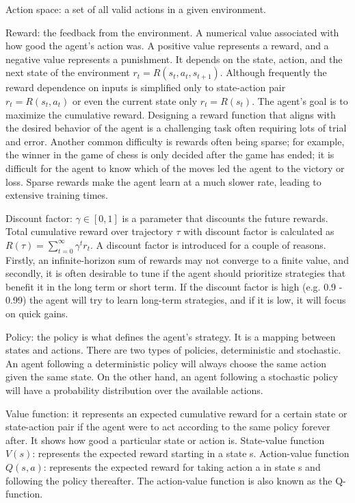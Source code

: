 \bigskip \noindent
Action space: a set of all valid actions in a given environment.

\bigskip \noindent
Reward: the feedback from the environment. A numerical value associated with how good the agent's action was. A positive value represents a reward, and a negative value represents a punishment. It depends on the state, action, and the next state of the environment $r_t = R(s_t, a_t, s_{t+1})$. Although frequently the reward dependence on inputs is simplified only to state-action pair $r_t = R(s_t, a_t)$ or even the current state only $r_t = R(s_t)$. The agent's goal is to maximize the cumulative reward. Designing a reward function that aligns with the desired behavior of the agent is a challenging task often requiring lots of trial and error. Another common difficulty is rewards often being sparse; for example, the winner in the game of chess is only decided after the game has ended; it is difficult for the agent to know which of the moves led the agent to the victory or loss. Sparse rewards make the agent learn at a much slower rate, leading to extensive training times.

\bigskip \noindent
Discount factor: $\gamma \in [0,1] $ is a parameter that discounts the future rewards. Total cumulative reward over trajectory $\tau$ with discount factor is calculated as $R(\tau) = \sum_{t=0}^{\infty} \gamma^t r_t$. A discount factor is introduced for a couple of reasons. Firstly, an infinite-horizon sum of rewards may not converge to a finite value, and secondly, it is often desirable to tune if the agent should prioritize strategies that benefit it in the long term or short term. If the discount factor is high (e.g. 0.9 - 0.99) the agent will try to learn long-term strategies, and if it is low, it will focus on quick gains.

\bigskip \noindent
Policy: the policy is what defines the agent's strategy. It is a mapping between states and actions. There are two types of policies, deterministic and stochastic. An agent following a deterministic policy will always choose the same action given the same state. On the other hand, an agent following a stochastic policy will have a probability distribution over the available actions.

\bigskip \noindent
Value function: it represents an expected cumulative reward for a certain state or state-action pair if the agent were to act according to the same policy forever after. It shows how good a particular state or action is. State-value function $V(s)$: represents the expected reward starting in a state s. Action-value function $Q(s, a)$: represents the expected reward for taking action a in state s and following the policy thereafter. The action-value function is also known as the Q-function.

